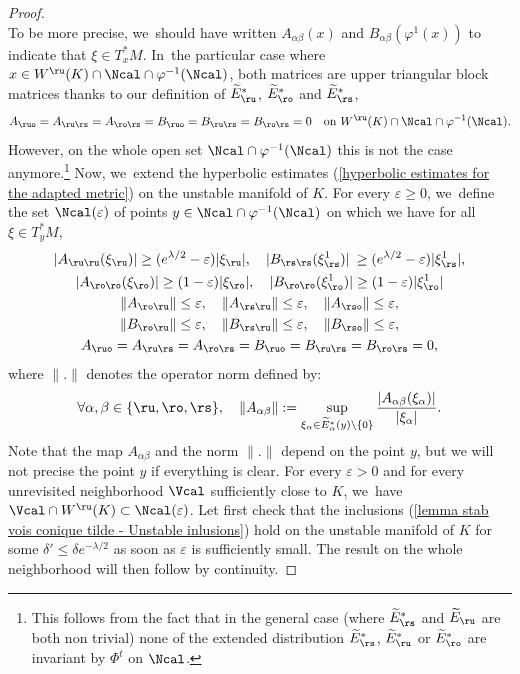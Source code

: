 \begin{proof}
\[\]
To be more precise, we~should have written $A_{\alpha \beta} (x)$ and $B_{\alpha \beta} (\varphi^1(x))$ to indicate that $\xi \in T_x^* M$. In~the particular case where $x \in W^\ru (K) \cap \Ncal \cap \varphi^{-1}(\Ncal)$, both matrices are upper triangular block matrices thanks to our definition of $\widetilde{E}_\ru^*$, $\widetilde{E}_\ro^*$ and $\widetilde{E}_\rs^*$, \ie
\[
A_{\ruo} = A_{\ru\rs} = A_{\ro\rs} = B_{\ruo} = B_{\ru\rs} = B_{\ro\rs} = 0 \quad\text{on }W^\ru (K) \cap \Ncal \cap \varphi^{-1}(\Ncal).
\]
However, on the whole open set $\Ncal \cap \varphi^{-1}(\Ncal)$ this is not the case anymore.\footnote{This follows from the fact that in the general case (where $\widetilde{E}_\rs^*$ and $\widetilde{E}_\ru$ are both non trivial) none of the extended distribution $\widetilde{E}_\rs^*$, $\widetilde{E}_\ru^*$ or $\widetilde{E}_\ro^*$ are invariant by $\Phi^t$ on $\Ncal$.} Now, we~extend the hyperbolic estimates (\ref{hyperbolic estimates for the adapted metric}) on the unstable manifold of $K$. For every $\varepsilon \geq 0$, we~define the set $\Ncal(\varepsilon)$ of points $y \in \Ncal \cap \varphi^{-1}(\Ncal)$ on which we have for all $\xi \in T_{y}^* M$,
\begin{gather}
|A_{\ru\ru} (\xi_\ru)| \geq (e^{\lambda/2 }-\varepsilon) |\xi_\ru|, \quad |B_{\rs\rs} (\xi_\rs^1)| \: \geq (e^{\lambda/2 } - \varepsilon) |\xi_\rs^1|,
\notag\\
\label{eq perturbe: lemme stabilite vois conique tilde - estimées matrices}
|A_{\ro\ro} (\xi_\ro)| \geq (1 - \varepsilon) |\xi_\ro|, \quad |B_{\ro\ro} (\xi_\ro^1)| \geq (1 - \varepsilon) |\xi_\ro^1|
\\
\notag
\| A_{\ro\ru} \| \leq \varepsilon, \quad \| A_{\rs\ru} \| \leq \varepsilon, \quad \| A_{\rso} \| \leq \varepsilon,\\
\notag
\| B_{\ro\ru} \| \leq \varepsilon, \quad \| B_{\rs\ru} \| \leq \varepsilon, \quad \| B_{\rso} \| \leq \varepsilon, \\
\notag
A_{\ruo} = A_{\ru\rs} = A_{\ro\rs} = B_{\ruo} = B_{\ru\rs} = B_{\ro\rs} = 0,
\end{gather}
where $\|. \|$ denotes the operator norm defined by:
\[
\forall \alpha, \beta \in \{\ru,\ro,\rs\}, \quad \| A_{\alpha \beta} \|:= \sup_{\xi_{\alpha} \in \widetilde{E}_{\alpha}^* (y) \setminus \{0 \}} \frac{|A_{\alpha \beta} (\xi_{\alpha})|}{ |\xi_{\alpha}|}.
\]
Note that the map $A_{\alpha \beta}$ and the norm $\|.\|$ depend on the point $y$, but we will not precise the point $y$ if everything is clear. For every $\varepsilon > 0$ and for every unrevisited neighborhood $\Vcal$ sufficiently close to $K$, we~have $\Vcal \cap W^\ru (K) \subset \Ncal (\varepsilon)$. Let first check that the inclusions (\ref{lemma stab vois conique tilde - Unstable inlusions}) hold on the unstable manifold of $K$ for some $\delta' \leq \delta e^{-\lambda/2}$ as soon as $\varepsilon$ is sufficiently small. The result on the whole neighborhood will then follow by continuity.


\end{proof}
